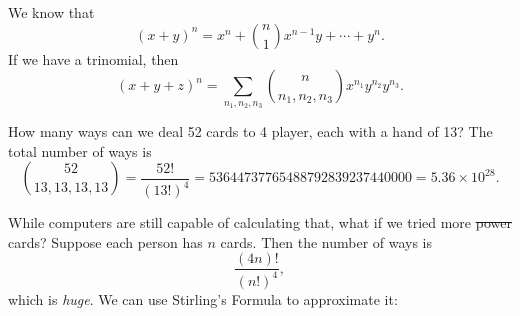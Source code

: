 \documentclass[a4paper]{article}
\begin{document}
\begin{eg}
  We know that
  \[
    (x + y)^n = x^n + \binom{n}{1}x^{n - 1}y + \cdots + y^n.
  \]
  If we have a trinomial, then
  \[
    (x + y + z)^n = \sum_{n_1, n_2, n_3} \binom{n}{n_1, n_2, n_3} x^{n_1}y^{n_2}y^{n_3}.
  \]
\end{eg}

\begin{eg}
  How many ways can we deal 52 cards to 4 player, each with a hand of 13? The total number of ways is
  \[
    \binom{52}{13, 13, 13, 13} = \frac{52!}{(13!)^4} = 53644737765488792839237440000 = 5.36\times 10^{28}.
  \]
\end{eg}


While computers are still capable of calculating that, what if we tried more \st{power} cards? Suppose each person has $n$ cards. Then the number of ways is
\[
  \frac{(4n)!}{(n!)^4},
\]
which is \emph{huge}. We can use Stirling's Formula to approximate it:
\end{document}
